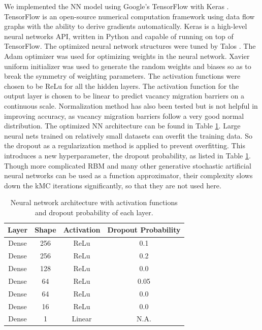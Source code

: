 We implemented the \ac{NN} model using Google's TensorFlow \cite{abadi2016tensorflow} with Keras \cite{chollet2015keras}. TensorFlow is an open-source numerical computation framework using data flow graphs with the ability to derive gradients automatically. Keras is a high-level neural networks API, written in Python and capable of running on top of TensorFlow. The optimized neural network structures were tuned by Talos \cite{Autonomio2019Talos}. The Adam optimizer \cite{kingma2014adam} was used for optimizing weights in the neural network. Xavier uniform initializer \cite{glorot2010understanding} was used to generate the random weights and biases so as to break the symmetry of weighting parameters. The activation functions were chosen to be \acf{ReLu} for all the hidden layers. The activation function for the output layer is chosen to be linear to predict vacancy migration barriers on a continuous scale. Normalization method has also been tested but is not helpful in improving accuracy, as vacancy migration barriers follow a very good normal distribution.  The optimized \ac{NN} architecture can be found in Table \ref{Chap:Al/Vac:tab:NN}. Large neural nets trained on relatively small datasets can overfit the training data. So the dropout as a regularization method is applied to prevent overfitting. This introduces a new hyperparameter, the dropout probability, as listed in Table \ref{Chap:Al/Vac:tab:NN}. Though more complicated \acf{RBM} and many other generative stochastic artificial neural networks can be used as a function approximator, their complexity slows down the \ac{kMC} iterations significantly, so that they are not used here.

\begin{table}[!htbp]
\centering
\caption[Neural network architecture with activation functions and dropout probability of each layer.]{Neural network architecture with activation functions and dropout probability of each layer.}
\label{Chap:Al/Vac:tab:NN}
\begin{tabular}{cccc}
\\
\hline
\hline
Layer & Shape  & Activation  & Dropout Probability\\ 
\hline
Dense & 256    & ReLu       & 0.1                 \\
Dense & 256    & ReLu       & 0.2                 \\
Dense & 128    & ReLu       & 0.0                 \\
Dense & 64     & ReLu       & 0.05                \\
Dense & 64     & ReLu       & 0.0                 \\
Dense & 16     & ReLu       & 0.0                 \\
Dense & 1      & Linear     & N.A.                \\ 
\hline
\hline
\end{tabular}
\end{table}



